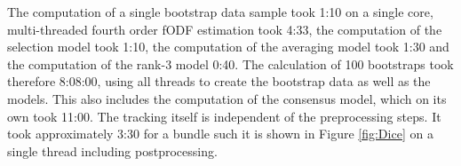 The computation of a single bootstrap data sample took 1:10 on a single core,
multi-threaded fourth order fODF estimation took 4:33, the computation of the
selection model took 1:10, the computation of the averaging model took 1:30 and
the computation of the rank-3 model 0:40. The calculation of 100 bootstraps took
therefore 8:08:00, using all threads to create the bootstrap data as well as the
models. This also includes the computation of the consensus model, which on its
own took 11:00. The tracking itself is independent of the preprocessing steps.
It took approximately 3:30 for a bundle such it is shown in Figure
\ref{fig:Dice} on a single thread including postprocessing.  



